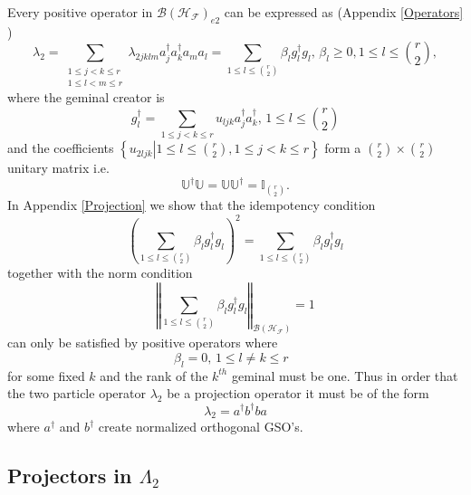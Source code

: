 \documentclass[aps,preprint]{revtex4}%
\begin{document}
Every positive operator in $\mathcal{B}\left(  \mathcal{H}_{\mathcal{F}%
}\right)  _{e2}$ can be expressed as (Appendix \ref{Operators} )
\begin{equation}
\lambda_{2}=\sum_{\substack{1\leq j<k\leq r\\1\leq l<m\leq r}}\lambda
_{2jklm}a_{j}^{\dagger}a_{k}^{\dagger}a_{m}a_{l}=\sum_{1\leq l\leq\binom{r}%
{2}}\beta_{l}g_{l}^{\dagger}g_{l},\,\beta_{l}\geq0,1\leq l\leq\binom{r}{2},
\end{equation}
where the geminal creator is
\begin{equation}
g_{l}^{\dagger}=\sum_{1\leq j<k\leq r}u_{ljk}a_{j}^{\dagger}a_{k}^{\dagger
},\,1\leq l\leq\binom{r}{2}%
\end{equation}
and the coefficients $\left\{  \left.  u_{2ljk}\right\vert 1\leq l\leq
\binom{r}{2},1\leq j<k\leq r\right\}  $ form a $\binom{r}{2}\times\binom{r}%
{2}$ unitary matrix i.e.
\begin{equation}
\mathbb{U}^{\dagger}\mathbb{U}=\mathbb{UU}^{\dagger}=\mathbb{I}_{\binom{r}{2}%
}.
\end{equation}
In Appendix \ref{Projection} we show that the idempotency condition
\begin{equation}
\left(  \sum_{1\leq l\leq\binom{r}{2}}\beta_{l}g_{l}^{\dagger}g_{l}\right)
^{2}=\sum_{1\leq l\leq\binom{r}{2}}\beta_{l}g_{l}^{\dagger}g_{l}%
\end{equation}
together with the norm condition
\begin{equation}
\left\Vert \sum_{1\leq l\leq\binom{r}{2}}\beta_{l}g_{l}^{\dagger}%
g_{l}\right\Vert _{\mathcal{B}\left(  \mathcal{H}_{\mathcal{F}}\right)  }=1
\end{equation}
can only be satisfied by positive operators where
\begin{equation}
\beta_{l}=0,\,1\leq l\neq k\leq r\text{ }%
\end{equation}
for some fixed $k$ and the rank of the $k^{th}$ geminal must be one. Thus in
order that the two particle operator $\lambda_{2}$ be a projection operator it
must be of the form
\begin{equation}
\lambda_{2}=a^{\dagger}b^{\dagger}ba
\end{equation}
where $a^{\dagger}$ and $b^{\dagger}$ create normalized orthogonal GSO's.

\subsection{Projectors in $\Lambda_{2}$ \label{Proj1&2}}
\end{document}
